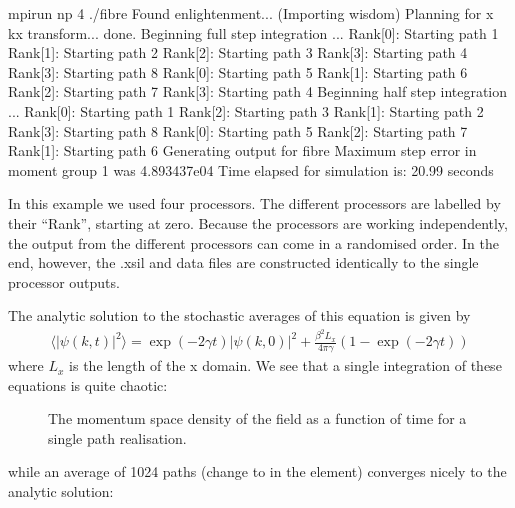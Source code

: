 \documentclass[letterpaper,10pt,english]{sphinxmanual}
\begin{document}
\begin{sphinxVerbatim}[commandchars=\\\{\}]
\PYGZdl{} mpirun \PYGZhy{}np 4 ./fibre
Found enlightenment... (Importing wisdom)
Planning for x \PYGZlt{}\PYGZhy{}\PYGZhy{}\PYGZhy{}\PYGZgt{} kx transform... done.
Beginning full step integration ...
Rank[0]: Starting path 1
Rank[1]: Starting path 2
Rank[2]: Starting path 3
Rank[3]: Starting path 4
Rank[3]: Starting path 8
Rank[0]: Starting path 5
Rank[1]: Starting path 6
Rank[2]: Starting path 7
Rank[3]: Starting path 4
Beginning half step integration ...
Rank[0]: Starting path 1
Rank[2]: Starting path 3
Rank[1]: Starting path 2
Rank[3]: Starting path 8
Rank[0]: Starting path 5
Rank[2]: Starting path 7
Rank[1]: Starting path 6
Generating output for fibre
Maximum step error in moment group 1 was 4.893437e\PYGZhy{}04
Time elapsed for simulation is: 20.99 seconds
\end{sphinxVerbatim}

\sphinxAtStartPar
In this example we used four processors.  The different processors are labelled by their “Rank”, starting at zero.  Because the processors are working independently, the output from the different processors can come in a randomised order.  In the end, however, the .xsil and data files are constructed identically to the single processor outputs.

\sphinxAtStartPar
The analytic solution to the stochastic averages of this equation is given by
\begin{equation*}
\begin{split}\langle |\psi(k,t)|^2 \rangle = \exp(-2\gamma t)|\psi(k,0)|^2 +\frac{\beta^2 L_x}{4\pi \gamma} \left(1-\exp(-2\gamma t)\right)\end{split}
\end{equation*}
\sphinxAtStartPar
where \(L_x\) is the length of the x domain.  We see that a single integration of these equations is quite chaotic:

\begin{figure}[htbp]
\centering
\capstart

\noindent{}
\caption{The momentum space density of the field as a function of time for a single path realisation.}\label{\detokenize{worked_examples:id3}}\end{figure}

\sphinxAtStartPar
while an average of 1024 paths (change  to  in the  element) converges nicely to the analytic solution:
\end{document}
